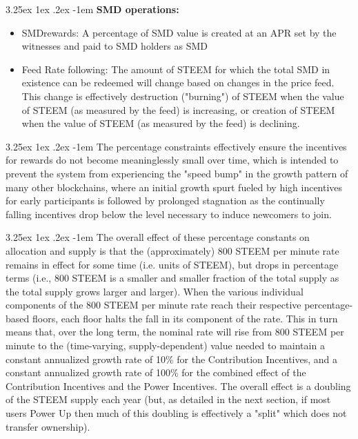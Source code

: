 \documentclass{article}
\makeatletter
\renewcommand\paragraph{\@startsection{paragraph}{5}{\z@}%
  {3.25ex \@plus1ex \@minus.2ex}%
  {-1em}%
  {\normalfont\normalsize\bfseries}}
\makeatother
\begin{document}
		\paragraph{}
			\textbf{SMD operations:}

		\begin{itemize}
			\item SMDrewards: A percentage of SMD value is created at an APR set by the witnesses and paid to SMD holders as SMD
			\item Feed Rate following: The amount of STEEM for which the total SMD in existence can be redeemed will change based on changes in the price feed. This change is effectively destruction ("burning") of STEEM when the value of STEEM (as measured by the feed) is increasing, or creation of STEEM when the value of STEEM (as measured by the feed) is declining.
		\end{itemize}

		\paragraph{}
			The percentage constraints effectively ensure the incentives for rewards do not become meaninglessly small over time, which is intended to prevent the system from experiencing the "speed bump" in the growth pattern of many other blockchains, where an initial growth spurt fueled by high incentives for early participants is followed by prolonged stagnation as the continually falling incentives drop below the level necessary to induce newcomers to join.

		\paragraph{}
			The overall effect of these percentage constants on allocation and supply is that the (approximately) 800 STEEM per minute rate remains in effect for some time (i.e. units of STEEM), but drops in percentage terms (i.e., 800 STEEM is a smaller and smaller fraction of the total supply as the total supply grows larger and larger). When the various individual components of the 800 STEEM per minute rate reach their respective percentage-based floors, each floor halts the fall in its component of the rate. This in turn means that, over the long term, the nominal rate will rise from 800 STEEM per minute to the (time-varying, supply-dependent) value needed to maintain a constant annualized growth rate of 10\% for the Contribution Incentives, and a constant annualized growth rate of 100\% for the combined effect of the Contribution Incentives and the Power Incentives. The overall effect is a doubling of the STEEM supply each year (but, as detailed in the next section, if most users Power Up then much of this doubling is effectively a "split" which does not transfer ownership).
\end{document}
